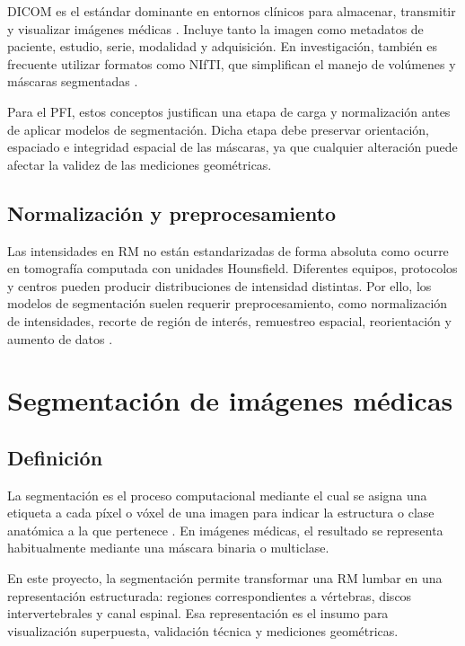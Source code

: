 DICOM es el estándar dominante en entornos clínicos para almacenar, transmitir y visualizar imágenes médicas \parencite{nema_dicom_2024}. Incluye tanto la imagen como metadatos de paciente, estudio, serie, modalidad y adquisición. En investigación, también es frecuente utilizar formatos como NIfTI, que simplifican el manejo de volúmenes y máscaras segmentadas \parencite{cox_nifti_2004}.

Para el PFI, estos conceptos justifican una etapa de carga y normalización antes de aplicar modelos de segmentación. Dicha etapa debe preservar orientación, espaciado e integridad espacial de las máscaras, ya que cualquier alteración puede afectar la validez de las mediciones geométricas.

\subsection{Normalización y preprocesamiento}

Las intensidades en RM no están estandarizadas de forma absoluta como ocurre en tomografía computada con unidades Hounsfield. Diferentes equipos, protocolos y centros pueden producir distribuciones de intensidad distintas. Por ello, los modelos de segmentación suelen requerir preprocesamiento, como normalización de intensidades, recorte de región de interés, remuestreo espacial, reorientación y aumento de datos \parencite{litjens_survey_2017,isensee_nnunet_2021}.

\section{Segmentación de imágenes médicas}

\subsection{Definición}

La segmentación es el proceso computacional mediante el cual se asigna una etiqueta a cada píxel o vóxel de una imagen para indicar la estructura o clase anatómica a la que pertenece \parencite{szeliski_computer_vision_2022}. En imágenes médicas, el resultado se representa habitualmente mediante una máscara binaria o multiclase.

En este proyecto, la segmentación permite transformar una RM lumbar en una representación estructurada: regiones correspondientes a vértebras, discos intervertebrales y canal espinal. Esa representación es el insumo para visualización superpuesta, validación técnica y mediciones geométricas.

